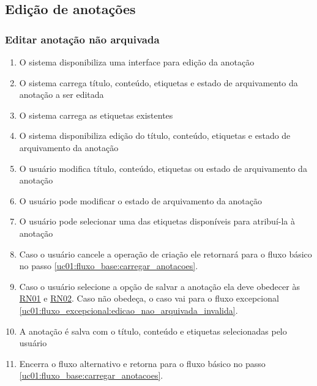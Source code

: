 \documentclass[
	12pt,				%
	oneside,			%
	a4paper,			%
	english,			%
	brazil,				%
	]{abntex2}
\begin{document}
\subsection{Edição de anotações}
\subsubsection{Editar anotação não arquivada} \label{uc01:fluxo_alternativo:editar_anotacao_nao_arquivada}
\begin{enumerate}
    \item O sistema disponibiliza uma interface para edição da anotação
    \item O sistema carrega título, conteúdo, etiquetas e estado de arquivamento da anotação a ser editada
    \item O sistema carrega as etiquetas existentes
    \item O sistema disponibiliza edição do título, conteúdo, etiquetas e estado de arquivamento da anotação
    \item O usuário modifica título, conteúdo, etiquetas ou estado de arquivamento da anotação \label{uc01:fluxo_alternativo:editar_anotacao_nao_arquivada:pode_escrever}
    \item O usuário pode modificar o estado de arquivamento da anotação
    \item O usuário pode selecionar uma das etiquetas disponíveis para atribuí-la à anotação
    \item Caso o usuário cancele a operação de criação ele retornará para o fluxo básico no passo \ref{uc01:fluxo_base:carregar_anotacoes}.
    \item Caso o usuário selecione a opção de salvar a anotação ela deve obedecer às \hyperref[uc01:rn01_validacao_anotacao]{RN01} e \hyperref[uc01:rn02_flag_arquivar]{RN02}. Caso não obedeça, o caso vai para o fluxo excepcional \ref{uc01:fluxo_excepcional:edicao_nao_arquivada_invalida}.
    \item A anotação é salva com o título, conteúdo e etiquetas selecionadas pelo usuário
    \item Encerra o fluxo alternativo e retorna para o fluxo básico no passo \ref{uc01:fluxo_base:carregar_anotacoes}.
\end{enumerate}
\end{document}
